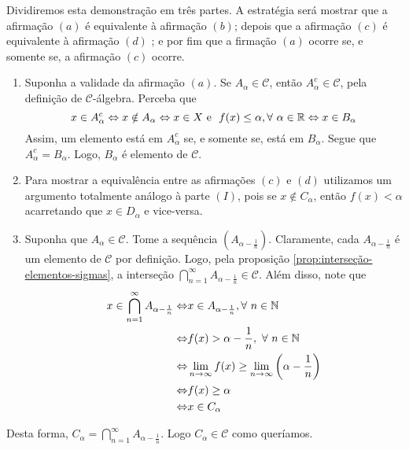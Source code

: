 \begin{prova}
    Dividiremos esta demonstração em três partes. A estratégia será mostrar que a afirmação $(a)$ é equivalente à afirmação $(b)$; depois que a afirmação $(c)$ é equivalente à afirmação $(d)$ ; e por fim que a firmação $(a)$ ocorre se, e somente se, a afirmação $(c)$ ocorre. 
    \begin{enumerate}[label* = (\Roman*)]
        \item Suponha a validade da afirmação $(a)$. Se $A_\alpha \in \mathcal{C}$, então $A_\alpha^c \in \mathcal{C}$, pela definição de $\mathcal{C}$-álgebra.
    Perceba que 
    $$
    x \in A_\alpha^c \Leftrightarrow   x \notin A_\alpha\\
    \Leftrightarrow  x \in X \textrm{\ e \ } f(x) \leq \alpha, \forall\ \alpha \in \R
    \Leftrightarrow x \in B_\alpha    
	$$ Assim, um elemento está em $A_\alpha^c$ se, e somente se, está em $B_\alpha$. Segue que $A_\alpha^c = B_\alpha$. Logo, $B_\alpha$ é elemento de $\mathcal{C}$.
	\item Para mostrar a equivalência entre as afirmações $(c)$ e $(d)$ utilizamos um argumento totalmente análogo à parte $(I)$, pois se $x \notin C_\alpha$, então $f(x) < \alpha$ acarretando que $x \in D_\alpha$ e vice-versa.
	\item Suponha que $A_\alpha \in \mathcal{C}$. Tome a sequência $\left(A_{\alpha -\frac{1}{n}}\right)$. Claramente, cada $A_{\alpha - \frac{1}{n}}$ é um elemento de $\mathcal{C}$ por definição.
	Logo, pela proposição \ref{prop:interseção-elementos-sigmas}, a interseção $\displaystyle \bigcap_{n = 1}^\infty A_{\alpha -\frac{1}{n}} \in \mathcal{C}$. Além disso, note que 
\begin{align*}
    x \in \displaystyle \bigcap_{n = 1}^\infty A_{\alpha -\frac{1}{n}}
    \Leftrightarrow & x \in A_{\alpha - \frac{1}{n}}, \forall \ n \in \operatorname{\mathbb{N}}\\
    \Leftrightarrow & f(x)> \alpha -\dfrac{1}{n},  \ \forall \ n \in \operatorname{\mathbb{N}}\\
    \Leftrightarrow &\lim_{n \to \infty} f(x) \geq \lim_{n \to \infty} \left(\alpha - \dfrac{1}{n}\right)\\
    \Leftrightarrow & f(x) \geq \alpha \\
    \Leftrightarrow & x \in C_\alpha
\end{align*}
    \end{enumerate}
Desta forma, $C_\alpha = \displaystyle \bigcap_{n = 1}^\infty A_{\alpha -\frac{1}{n}} $. Logo $C_\alpha \in \mathcal{C}$ como queríamos.


\end{prova}
